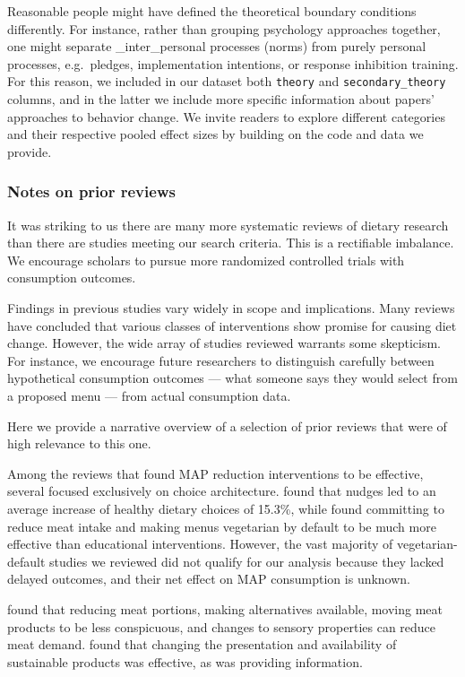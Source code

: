 \documentclass[sn-nature,referee,pdflatex]{sn-jnl}
\begin{document}
Reasonable people might have defined the theoretical boundary conditions
differently. For instance, rather than grouping psychology approaches
together, one might separate \_inter\_personal processes (norms) from
purely personal processes, e.g.~pledges, implementation intentions, or
response inhibition training. For this reason, we included in our
dataset both \texttt{theory} and \texttt{secondary\_theory} columns, and
in the latter we include more specific information about papers'
approaches to behavior change. We invite readers to explore different
categories and their respective pooled effect sizes by building on the
code and data we provide.

\subsubsection{Notes on prior reviews}\label{sec5.4.5}

It was striking to us there are many more systematic reviews of dietary
research than there are studies meeting our search criteria. This is a
rectifiable imbalance. We encourage scholars to pursue more randomized
controlled trials with consumption outcomes.

Findings in previous studies vary widely in scope and implications. Many
reviews have concluded that various classes of interventions show
promise for causing diet change. However, the wide array of studies
reviewed warrants some skepticism. For instance, we encourage future
researchers to distinguish carefully between hypothetical consumption
outcomes --- what someone says they would select from a proposed menu
--- from actual consumption data.

Here we provide a narrative overview of a selection of prior reviews
that were of high relevance to this one.

Among the reviews that found MAP reduction interventions to be
effective, several focused exclusively on choice architecture.
\citep{arno2016} found that nudges led to an average increase of healthy
dietary choices of 15.3\%, while \citep{byerly2018} found committing to
reduce meat intake and making menus vegetarian by default to be much
more effective than educational interventions. However, the vast
majority of vegetarian-default studies we reviewed did not qualify for
our analysis because they lacked delayed outcomes, and their net effect
on MAP consumption is unknown.

\citep{bianchi2018restructuring} found that reducing meat portions,
making alternatives available, moving meat products to be less
conspicuous, and changes to sensory properties can reduce meat demand.
\citep{pandey2023} found that changing the presentation and availability
of sustainable products was effective, as was providing information.
\end{document}
